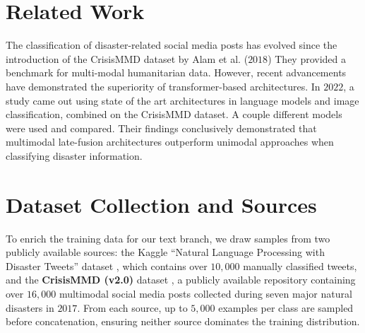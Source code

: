 \documentclass[11pt,letterpaper]{article}
\begin{document}
\section{Related Work}
The classification of disaster-related social media posts has evolved since the introduction of the CrisisMMD dataset by Alam et al. ($2018$)\cite{alam2018} They provided a benchmark for multi-modal humanitarian data. However, recent advancements have demonstrated the superiority of transformer-based architectures. In $2022$, a study came out using state of the art architectures in language models and image classification, combined on the CrisisMMD dataset.\cite{kotha2022} A couple different models were used and compared. Their findings conclusively demonstrated that multimodal late-fusion architectures outperform unimodal approaches when classifying disaster information.

\begin{table}[h]
\centering
\caption{Accuracy (\%) for Informative vs Non-Informative using Text + Image Modality (Kotha et al., 2022)}
\label{tab:informative_fusion_results}


\end{table}

\section{Dataset Collection and Sources}
To enrich the training data for our text branch, we draw samples from two publicly available sources: the Kaggle ``Natural Language Processing with Disaster Tweets'' dataset \cite{kaggle_dataset}, which contains over $10,000$ manually classified tweets, and the \textbf{CrisisMMD (v2.0)} dataset \cite{alam2018}, a publicly available repository containing over $16,000$ multimodal social media posts collected during seven major natural disasters in $2017$. From each source, up to $5,000$ examples per class are sampled before concatenation, ensuring neither source dominates the training distribution.
\end{document}
